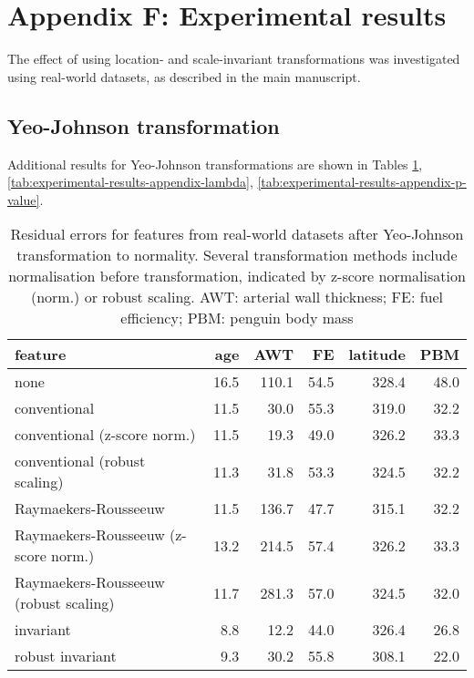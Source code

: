 \documentclass[
  a4paper,
]{article}
\begin{document}
\section{Appendix F: Experimental
results}\label{appendix-f-experimental-results}

The effect of using location- and scale-invariant transformations was
investigated using real-world datasets, as described in the main
manuscript.

\subsection{Yeo-Johnson
transformation}\label{yeo-johnson-transformation}

Additional results for Yeo-Johnson transformations are shown in Tables
\ref{tab:experimental-results-appendix-residuals},
\ref{tab:experimental-results-appendix-lambda},
\ref{tab:experimental-results-appendix-p-value}.

\begin{table}
\begin{center}
\caption{Residual errors for features from real-world datasets after Yeo-Johnson transformation to normality. 
Several transformation methods include normalisation before transformation, indicated by z-score normalisation (norm.) or robust scaling. 
AWT: arterial wall thickness; FE: fuel efficiency; PBM: penguin body mass}
\label{tab:experimental-results-appendix-residuals}
\begin{tabular}{l | r r r r r}

\toprule
feature & age & AWT & FE & latitude & PBM \\

\midrule
none                                  & 16.5 & 110.1 & 54.5 & 328.4 & 48.0 \\
conventional                          & 11.5 &  30.0 & 55.3 & 319.0 & 32.2 \\
conventional (z-score norm.)          & 11.5 &  19.3 & 49.0 & 326.2 & 33.3 \\
conventional (robust scaling)         & 11.3 &  31.8 & 53.3 & 324.5 & 32.2 \\
Raymaekers-Rousseeuw                  & 11.5 & 136.7 & 47.7 & 315.1 & 32.2 \\
Raymaekers-Rousseeuw (z-score norm.)  & 13.2 & 214.5 & 57.4 & 326.2 & 33.3 \\
Raymaekers-Rousseeuw (robust scaling) & 11.7 & 281.3 & 57.0 & 324.5 & 32.0 \\
invariant                             &  8.8 &  12.2 & 44.0 & 326.4 & 26.8 \\
robust invariant                      &  9.3 &  30.2 & 55.8 & 308.1 & 22.0 \\

\bottomrule
\end{tabular}
\end{center}
\end{table}
\end{document}
